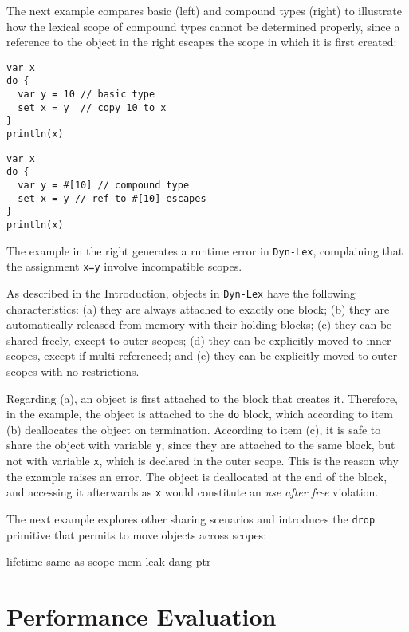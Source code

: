 \documentclass[12pt]{article}
\newcommand{\code}[1] {\texttt{\footnotesize{#1}}}
\newcommand{\lex} {\texttt{Dyn-Lex}\xspace}
\begin{document}
The next example compares basic (left) and compound types (right) to illustrate
how the lexical scope of compound types cannot be determined properly, since a
reference to the object in the right escapes the scope in which it is first
created:

\noindent
{\footnotesize
\begin{minipage}[t]{0.5\textwidth}
\begin{verbatim}
var x
do {
  var y = 10 // basic type
  set x = y  // copy 10 to x
}
println(x)
\end{verbatim}
\end{minipage}
\begin{minipage}[t]{0.5\textwidth}
\begin{verbatim}
var x
do {
  var y = #[10] // compound type
  set x = y // ref to #[10] escapes
}
println(x)
\end{verbatim}
\end{minipage}
}

The example in the right generates a runtime error in \lex, complaining that
the assignment \code{x=y} involve incompatible scopes.

As described in the Introduction, objects in \lex have the following
characteristics:
    (a) they are always attached to exactly one block;
    (b) they are automatically released from memory with their holding blocks;
    (c) they can be shared freely, except to outer scopes;
    (d) they can be explicitly moved to inner scopes, except if multi
        referenced; and
    (e) they can be explicitly moved to outer scopes with no restrictions.

Regarding (a), an object is first attached to the block that creates it.
Therefore, in the example, the object is attached to the \code{do} block, which
according to item (b) deallocates the object on termination.
According to item (c), it is safe to share the object with variable \code{y},
since they are attached to the same block, but not with variable \code{x},
which is declared in the outer scope.
This is the reason why the example raises an error.
The object is deallocated at the end of the block, and accessing it afterwards
as \code{x} would constitute an \emph{use after free} violation.

The next example explores other sharing scenarios and introduces the
\code{drop} primitive that permits to move objects across scopes:

%
lifetime same as scope
mem leak
dang ptr

\section{Performance Evaluation}
\label{sec.eval}
\end{document}
